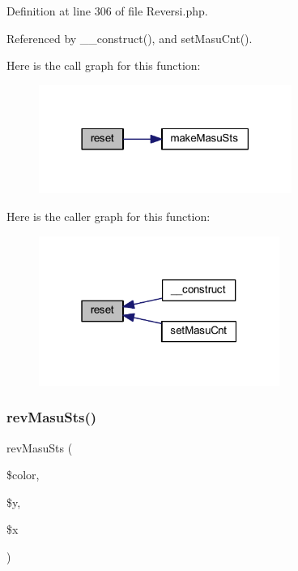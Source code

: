 Definition at line 306 of file Reversi.\+php.



Referenced by \+\_\+\+\_\+construct(), and set\+Masu\+Cnt().

Here is the call graph for this function\+:\nopagebreak
\begin{figure}[H]
\begin{center}
\leavevmode
\includegraphics[width=234pt]{class_reversi_a4a20559544fdf4dcb457e258dc976cf8_cgraph}
\end{center}
\end{figure}
Here is the caller graph for this function\+:\nopagebreak
\begin{figure}[H]
\begin{center}
\leavevmode
\includegraphics[width=223pt]{class_reversi_a4a20559544fdf4dcb457e258dc976cf8_icgraph}
\end{center}
\end{figure}
\mbox{\label{class_reversi_af29cd3f41dc1cffead056dbbed55ae7a}} 
\subsubsection{\texorpdfstring{rev\+Masu\+Sts()}{revMasuSts()}}
{\footnotesize\ttfamily rev\+Masu\+Sts (\begin{DoxyParamCaption}\item[{}]{\$color,  }\item[{}]{\$y,  }\item[{}]{\$x }\end{DoxyParamCaption})\hspace{0.3cm}{\ttfamily [private]}}



